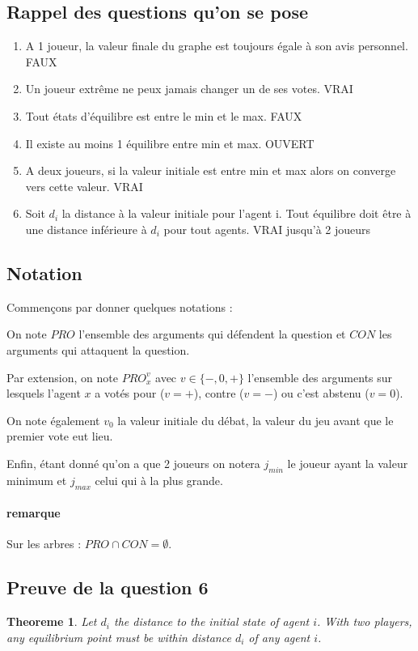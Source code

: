 \documentclass[12pt]{article}
\newtheorem{theoreme}{Theoreme}[section]
\theoremstyle{defi}
\theoremstyle{not}
\theoremstyle{prob}
\begin{document}
    \subsection{Rappel des questions qu'on se pose}
      \begin{enumerate}
        \item A 1 joueur, la valeur finale du graphe est toujours égale à son avis personnel. FAUX
        \item Un joueur extrême ne peux jamais changer un de ses votes. VRAI
        \item Tout états d'équilibre est entre le min et le max. FAUX
        \item Il existe au moins 1 équilibre entre min et max. OUVERT
        \item A deux joueurs, si la valeur initiale est entre min et max alors on converge vers cette valeur. VRAI
        \item Soit $d_i$ la distance à la valeur initiale pour l'agent i. Tout équilibre doit être à une distance inférieure à $d_i$ pour tout agents. VRAI jusqu'à 2 joueurs
      \end{enumerate}

    \subsection{Notation}
      Commençons par donner quelques notations :

      On note $PRO$ l'ensemble des arguments qui défendent la question et $CON$ les arguments qui attaquent la question.

      Par extension, on note $PRO^v_x$ avec $v \in \{-, 0, +\}$ l'ensemble des arguments sur lesquels l'agent $x$ a votés pour ($v = +$), contre ($v = -$) ou c'est abstenu ($v = 0$).

      On note également $v_0$ la valeur initiale du débat, la valeur du jeu avant que le premier vote eut lieu.

      Enfin, étant donné qu'on a que 2 joueurs on notera $j_{min}$ le joueur ayant la valeur minimum et $j_{max}$ celui qui à la plus grande.

      \paragraph{remarque} Sur les arbres : $PRO \cap CON = \emptyset$.


    \subsection{Preuve de la question 6}
    \begin{theoreme}
    \label{thm:question_6}
       Let $d_i$ the distance to the initial state of agent $i$. With two players, any equilibrium point must be within distance $d_i$ of any agent $i$.
    \end{theoreme}
\end{document}
